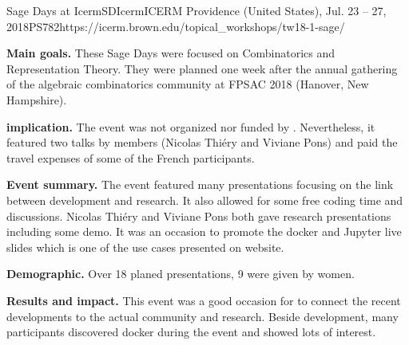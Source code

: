 \begin{event}{Sage Days at Icerm}{SDIcerm}{ICERM Providence (United States), Jul. 23 -- 27, 2018}{PS}{78}{2}{https://icerm.brown.edu/topical_workshops/tw18-1-sage/}

\textbf{Main goals.} These Sage Days were focused on Combinatorics and Representation Theory. They were planned one week after the annual gathering of the algebraic combinatorics community at FPSAC 2018 (Hanover, New Hampshire).

\textbf{\ODK implication.} The event was not organized nor funded by \ODK. Nevertheless, it featured two talks by \ODK members (Nicolas Thiéry and Viviane Pons) and \ODK paid the travel expenses of some of the French participants.

\textbf{Event summary.} The event featured many presentations focusing on the link between \Sage development and research. It also allowed for some free coding time and discussions. Nicolas Thiéry and Viviane Pons both gave research presentations including some \Sage demo. It was an occasion to promote the \Sage docker and Jupyter live slides which is one of the use cases presented on \ODK website.

\textbf{Demographic.} Over 18 planed presentations, 9 were given by women.

\textbf{Results and impact.} This event was a good occasion for \ODK to connect the recent developments to the actual community and research. Beside \Sage development, many participants discovered docker during the event and showed lots of interest.

\end{event}
